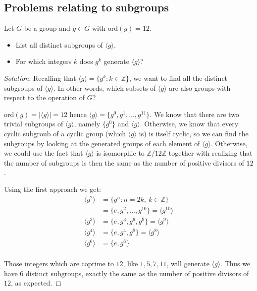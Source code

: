 \subsection{Problems relating to subgroups}
\begin{prob}
    Let $G$ be a group and $g \in G$ with  $\text{ord}(g) = 12$. 

    \begin{itemize}
        \item List all distinct subgroups of $\langle g \rangle$.
        \item For which integers $k$ does $g^k$ generate $\langle g \rangle$?
    \end{itemize}
\end{prob}
\begin{proof}[Solution]
    Recalling that $\langle g \rangle = \{g^k : k \in \mathbb Z\}$, 
    we want to find all the distinct subgroups of $\langle g \rangle$. 
    In other words, which subsets of $\langle g \rangle$ are also 
    groups with respect to the operation of $G$? 

    $\text{ord}(g) = |\langle g \rangle| = 12$ hence $\langle g \rangle = \{g^0, g^1, \ldots, g^{11}\}$.
    We know that there are two trivial subgroups of $\langle g \rangle$, namely $\{g^0\}$ and $\langle g \rangle$. 
    Otherwise, we know that every cyclic subgroub of a cyclic group (which $\langle g\rangle$ is) is itself 
    cyclic, so we can find the subgroups by looking at the generated groups of each element 
    of $\langle g \rangle$. Otherwise, we could use the fact that 
    $\langle g\rangle $ is isomorphic to $\mathbb Z/12\mathbb Z$ together with realizing that the number 
    of subgroups is then the same as the number of positive divisors of $12$. 

    Using the first approach we get: 
    \begin{align*}
        \langle g^2 \rangle &= \{g^n : n = 2k, \: k \in \mathbb Z\} \\ 
                            &= \{e, g^2, \ldots, g^10\} = \langle g^10 \rangle \\ 
        \langle g^3 \rangle &= \{e, g^3, g^6, g^9\} = \langle g^9 \rangle \\ 
        \langle g^4 \rangle &= \{e, g^4, g^8\} = \langle g^8 \rangle \\ 
        \langle g^6 \rangle &= \{e, g^6\} \\ 
    \end{align*}
    
    Those integers which are coprime to $12$, like $1,5,7,11$, will generate $\langle g \rangle$. 
    Thus we have $6$ distinct subgroups, exactly the same as the number of 
    positive divisors of $12$, as expected. 
\end{proof}

